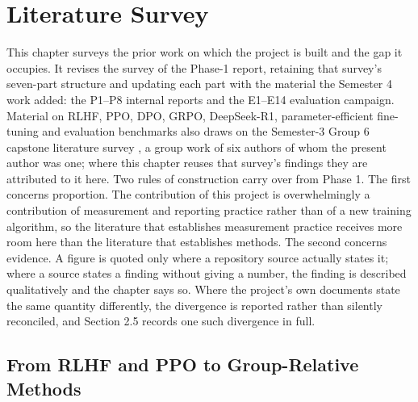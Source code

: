 \documentclass[12pt,a4paper]{report}
\begin{document}
\chapter{Literature Survey}\label{literature-survey}

This chapter surveys the prior work on which the project is built and
the gap it occupies. It revises the survey of the Phase-1 report,
retaining that survey's seven-part structure and updating each part with
the material the Semester 4 work added: the P1--P8 internal reports and
the E1--E14 evaluation campaign. Material on RLHF, PPO, DPO, GRPO,
DeepSeek-R1, parameter-efficient fine-tuning and evaluation benchmarks
also draws on the Semester-3 Group 6 capstone literature survey
\citep{group6capstone2026survey}, a group work of six authors of whom
the present author was one; where this chapter reuses that survey's
findings they are attributed to it here. Two rules of construction carry
over from Phase 1. The first concerns proportion. The contribution of
this project is overwhelmingly a contribution of measurement and
reporting practice rather than of a new training algorithm, so the
literature that establishes measurement practice receives more room here
than the literature that establishes methods. The second concerns
evidence. A figure is quoted only where a repository source actually
states it; where a source states a finding without giving a number, the
finding is described qualitatively and the chapter says so. Where the
project's own documents state the same quantity differently, the
divergence is reported rather than silently reconciled, and Section 2.5
records one such divergence in full.

\section{From RLHF and PPO to Group-Relative
Methods}\label{from-rlhf-and-ppo-to-group-relative-methods}
\end{document}
